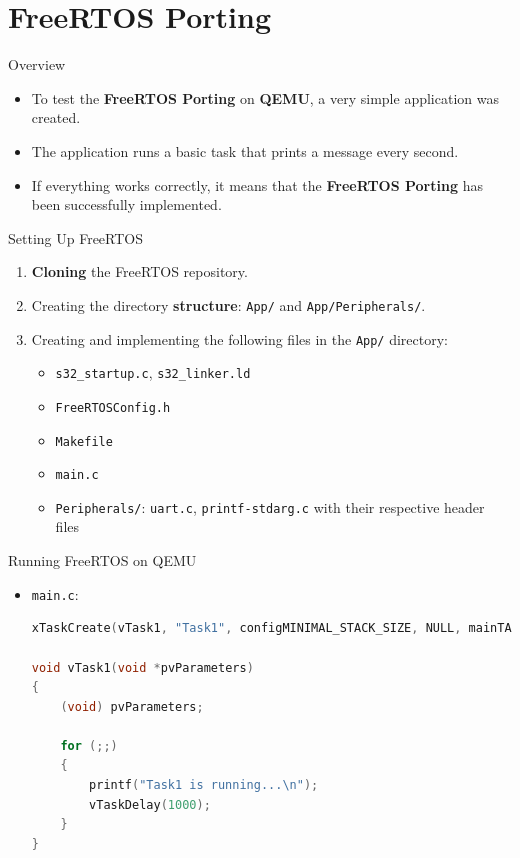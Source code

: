 
\section{FreeRTOS Porting}

\begin{frame}{Overview}
    \begin{itemize}
        \item To test the \textbf{FreeRTOS Porting} on \textbf{QEMU}, a very simple application was created.
        \item The application runs a basic task that prints a message every second.
        \item If everything works correctly, it means that the \textbf{FreeRTOS Porting} has been successfully implemented.
    \end{itemize}
\end{frame}

\begin{frame}{Setting Up FreeRTOS}
    \begin{enumerate}
        \item \textbf{Cloning} the FreeRTOS repository.
        \item Creating the directory \textbf{structure}: \texttt{App/} and \texttt{App/Peripherals/}.
        \item Creating and implementing the following files in the \texttt{App/} directory:
            \begin{itemize}
                \item \texttt{s32\_startup.c}, \texttt{s32\_linker.ld}
                \item \texttt{FreeRTOSConfig.h}
                \item \texttt{Makefile}
                \item \texttt{main.c}
                \item \texttt{Peripherals/}: \texttt{uart.c}, \texttt{printf-stdarg.c} with their respective header files
            \end{itemize}
    \end{enumerate}
\end{frame}

%     
%     
% 

\begin{frame}[fragile]{Running FreeRTOS on QEMU}
    \begin{itemize}
        \item \texttt{main.c}:
            \begin{lstlisting}[language=C]
xTaskCreate(vTask1, "Task1", configMINIMAL_STACK_SIZE, NULL, mainTASK_PRIORITY, NULL);

void vTask1(void *pvParameters) 
{
    (void) pvParameters;

    for (;;) 
    {
        printf("Task1 is running...\n");
        vTaskDelay(1000);
    }
}
            \end{lstlisting}
    \end{itemize}
\end{frame}


